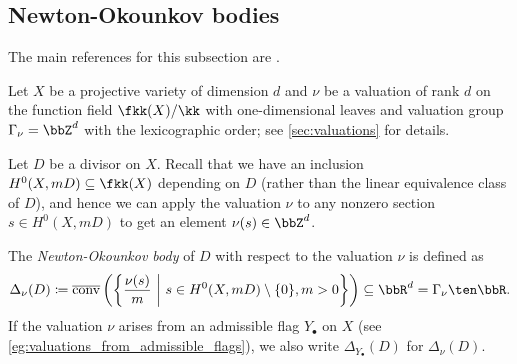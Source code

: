\subsection{Newton-Okounkov bodies}\label{subsec:Newton-Okounkov_bodies}


  The main references for this subsection are \cite{Lazarsfeld-Mustață-2009-Okounkov-Bodies,kaveh-Khovanskii-2012-Newton-Okounkov-bodies}.


  \begin{construction}

    Let $X$ be a projective variety of dimension $d$ and $\nu$ be a valuation of rank $d$ on the function field $\fkk(X)/\kk$ with one-dimensional leaves and valuation group $\Gamma_\nu = \bbZ^d$ with the lexicographic order; see \cref{sec:valuations} for details.

    Let $D$ be a divisor on $X$.
    Recall that we have an inclusion $H^0(X, mD) \subseteq \fkk(X)$ depending on $D$ (rather than the linear equivalence class of $D$), and hence we can apply the valuation $\nu$ to any nonzero section $s \in H^0(X, mD)$ to get an element $\nu(s) \in \bbZ^d$.

    The \emph{Newton-Okounkov body} of $D$ with respect to the valuation $\nu$ is defined as 
    \[ \Delta_{\nu}(D) \coloneqq \overline{\mathrm{conv}}\left( \left\{ \frac{\nu(s)}{m}\ \middle|\ s \in H^0(X, mD) \setminus \{0\}, m > 0 \right\} \right) \subseteq \bbR^d = \Gamma_\nu \ten \bbR. \]
    If the valuation $\nu$ arises from an admissible flag $Y_\bullet$ on $X$ (see \cref{eg:valuations_from_admissible_flags}), we also write $\Delta_{Y_\bullet}(D)$ for $\Delta_\nu(D)$.


     \Yang{}







  \end{construction}


